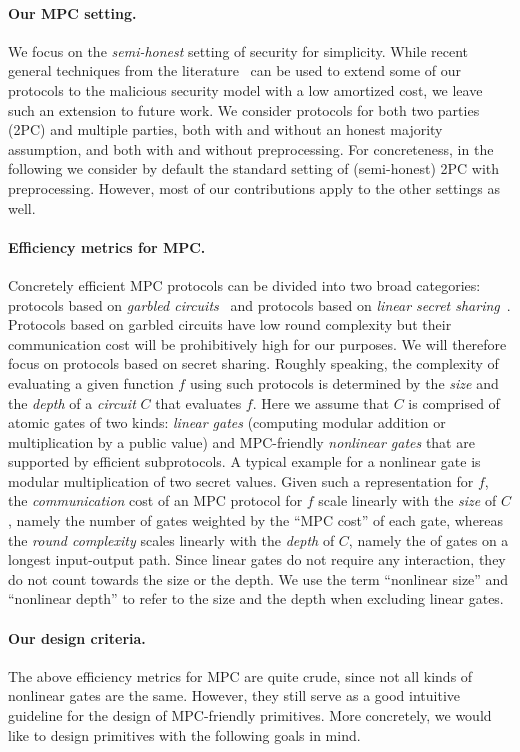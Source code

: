 \paragraph{Our MPC setting.} We focus on the {\em semi-honest} setting of security for simplicity. While recent general techniques from the literature~\cite{BBCGI19,BGIN19} can be used to extend some of our protocols to the malicious security model with a low amortized cost, we leave such an extension to future work. We consider protocols for both two parties (2PC) and multiple parties, both with and without an honest majority assumption, and both with and without preprocessing. For concreteness, in the following we consider by default the standard setting of (semi-honest) 2PC with preprocessing. However, most of our contributions apply to the other settings as well. 

\paragraph{Efficiency metrics for MPC.}   Concretely efficient MPC protocols can be divided into two broad categories: protocols based on {\em garbled circuits}~\cite{Yao} and protocols based on {\em linear secret sharing}~\cite{GMW,BGW,CCD}. Protocols based on garbled circuits have low round complexity but their communication cost will be prohibitively high for our purposes. We will therefore focus on protocols based on secret sharing. Roughly speaking, the complexity of evaluating  a given function $f$ using such protocols is determined by the {\em size} and the {\em depth} of a {\em circuit} $C$ that evaluates $f$.  Here we assume that $C$ is comprised of atomic gates of two kinds: {\em linear gates} (computing modular addition or multiplication by a public value) and MPC-friendly {\em nonlinear gates}  that are supported by efficient subprotocols. A typical example for a nonlinear gate is modular multiplication of two secret values. Given such a representation for $f$, the {\em communication} cost of an MPC protocol for $f$ scale linearly with the {\em size} of $C$, namely the number of gates weighted by the ``MPC cost'' of each gate, whereas the {\em round complexity} scales linearly with the {\em depth} of $C$, namely the of gates on a longest input-output path. Since linear gates do not require any interaction, they do not count towards the size or the depth. We use the term ``nonlinear size'' and ``nonlinear depth'' to refer to the size and the depth when excluding linear gates. 

\paragraph{Our design criteria.}  The above efficiency metrics for MPC are quite crude, since not all kinds of nonlinear gates are the same. However, they still serve as a good intuitive guideline for the design of MPC-friendly primitives. More concretely, we would like to design primitives with the following goals in mind.

